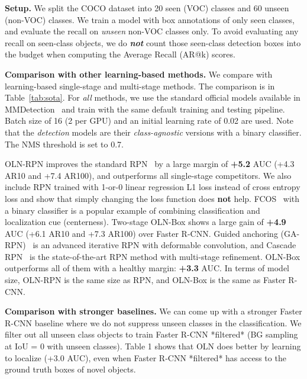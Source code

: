 \documentclass[10pt,twocolumn,letterpaper]{article}
\newcommand{\tableref}[1]{Table~\ref{#1}}
\renewcommand{\paragraph}[1]{\vspace{1mm}\noindent\textbf{#1}}
\begin{document}
\paragraph{Setup.} \quad 
We split the COCO dataset into 20 seen (VOC) classes and 60 unseen (non-VOC) classes. We train a model with box annotations of only seen classes, and evaluate the recall on \textit{unseen} non-VOC classes only. To avoid evaluating any recall on seen-class objects, we do \textit{\textbf{not}} count those seen-class detection boxes into the budget  when computing the Average Recall (AR@k) scores. 


\paragraph{Comparison with other learning-based methods.} \quad 
We compare with learning-based single-stage and multi-stage methods. The comparison is in \tableref{tab:sota}. For \textit{all} methods, we use the standard official models available in MMDetection~\cite{mmdetection} and train with the same default  training and testing pipeline. Batch size of 16 (2 per GPU) and an initial learning rate of 0.02 are used. Note that the \textit{detection} models are their \textit{class-agnostic} versions with a binary classifier. The NMS threshold is set to 0.7.

OLN-RPN improves the standard RPN~\cite{fasterNIPS2015} by a large margin of \textbf{+5.2} AUC (+4.3 AR10 and +7.4 AR100), and outperforms all single-stage competitors. We also include RPN trained with 1-or-0 linear regression L1 loss instead of cross entropy loss and show that simply changing the loss function does \textbf{not} help. FCOS~\cite{tian2019fcos} with a binary classifier is a popular example of combining classification and localization cue (centerness). Two-stage OLN-Box shows a large gain of \textbf{+4.9} AUC (+6.1 AR10 and +7.3 AR100) over Faster R-CNN. Guided anchoring (GA-RPN)~\cite{wang2019region} is an advanced iterative RPN with deformable convolution, and Cascade RPN~\cite{vu2019cascade} is the state-of-the-art RPN method with multi-stage refinement. OLN-Box outperforms all of them with a healthy margin: \textbf{+3.3} AUC. In terms of model size, OLN-RPN is the same size as RPN, and OLN-Box is the same as Faster R-CNN.

\paragraph{Comparison with stronger baselines.} \quad
We can come up with a stronger Faster R-CNN baseline where we do not suppress unseen classes in the classification. We filter out all unseen class objects to train Faster R-CNN *filtered* (BG sampling at IoU = 0 with unseen classes). Table 1 shows that OLN does better by learning to localize (+3.0 AUC), even when Faster R-CNN *filtered* has access to the ground truth boxes of novel objects.
\end{document}
